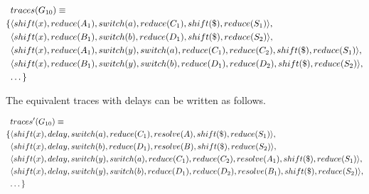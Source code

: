 \documentclass[envcountsame,runningheads]{llncs}
\begin{document}
{\small\parbox{.3\textwidth}{\begin{align*}
&traces(G_{10}) \equiv \\
\{ & \langle shift(x), reduce(A_1), switch(a), reduce(C_1), shift(\$), reduce(S_1) \rangle,\\
   & \langle shift(x), reduce(B_1), switch(b), reduce(D_1), shift(\$), reduce(S_2) \rangle,\\
   & \langle shift(x), reduce(A_1), switch(y), switch(a), reduce(C_1), reduce(C_2), shift(\$), reduce(S_1) \rangle,\\
   & \langle shift(x), reduce(B_1), switch(y), switch(b), reduce(D_1), reduce(D_2), shift(\$), reduce(S_2) \rangle,\\
   & \textellipsis \}
\end{align*}}}

The equivalent traces with delays can be written as follows.

{\small\parbox{.3\textwidth}{\begin{align*}
&traces^{\prime}(G_{10}) \equiv \\
 \{ & \langle shift(x), delay, switch(a), reduce(C_1), resolve(A), shift(\$), reduce(S_1) \rangle,\\
    & \langle shift(x), delay, switch(b), reduce(D_1), resolve(B), shift(\$), reduce(S_2) \rangle,\\
    & \langle shift(x), delay, switch(y), switch(a), reduce(C_1), reduce(C_2), resolve(A_1), shift(\$), reduce(S_1) \rangle,\\
    & \langle shift(x), delay, switch(y), switch(b), reduce(D_1), reduce(D_2), resolve(B_1), shift(\$), reduce(S_2) \rangle,\\
    & \textellipsis \}
\end{align*}}}

\end{document}
